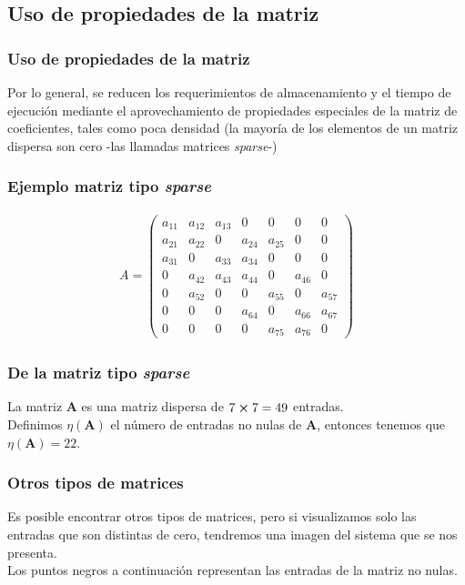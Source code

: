 \subsection*{Uso de propiedades de la matriz}
\begin{frame}
\frametitle{Uso de propiedades de la matriz}
Por lo general, se reducen los requerimientos de almacenamiento y el tiempo de ejecución mediante el aprovechamiento de propiedades especiales de la matriz de coeficientes, tales como poca densidad (la mayoría de los elementos de un matriz dispersa son cero -las llamadas matrices \textit{sparse}-)
\end{frame}
\begin{frame}
\frametitle{Ejemplo matriz tipo \emph{sparse}}
\begin{align*}
A = \begin{pmatrix}
a_{11} & a_{12} & a_{13} & 0 & 0 & 0 & 0 \\
a_{21} & a_{22} & 0 & a_{24} & a_{25} & 0 & 0 \\
a_{31} & 0 & a_{33} & a_{34} & 0 & 0 & 0 \\
0 & a_{42} & a_{43} & a_{44} & 0 & a_{46} & 0 \\
0 & a_{52} & 0 & 0 & a_{55} & 0 & a_{57} \\
0 & 0 & 0 & a_{64} & 0 & a_{66} & a_{67} \\
0 & 0 & 0 & 0 & a_{75} & a_{76} & 0
\end{pmatrix}
\end{align*}
\end{frame}
\begin{frame}
\frametitle{De la matriz tipo \emph{sparse}}
La matriz $\mathbf{A}$ es una matriz dispersa de $7 \cp 7 = 49$ entradas.
\\
\bigskip
Definimos $\eta (\mathbf{A})$ el número de entradas no nulas de $\mathbf{A}$, entonces tenemos que $\eta (\mathbf{A}) = 22$.
\end{frame}
\begin{frame}
\frametitle{Otros tipos de matrices}
Es posible encontrar otros tipos de matrices, pero si visualizamos solo las entradas que son distintas de cero, tendremos una imagen del sistema que se nos presenta.
\\
\bigskip
Los puntos negros a continuación representan las entradas de la matriz no nulas.
\end{frame}

